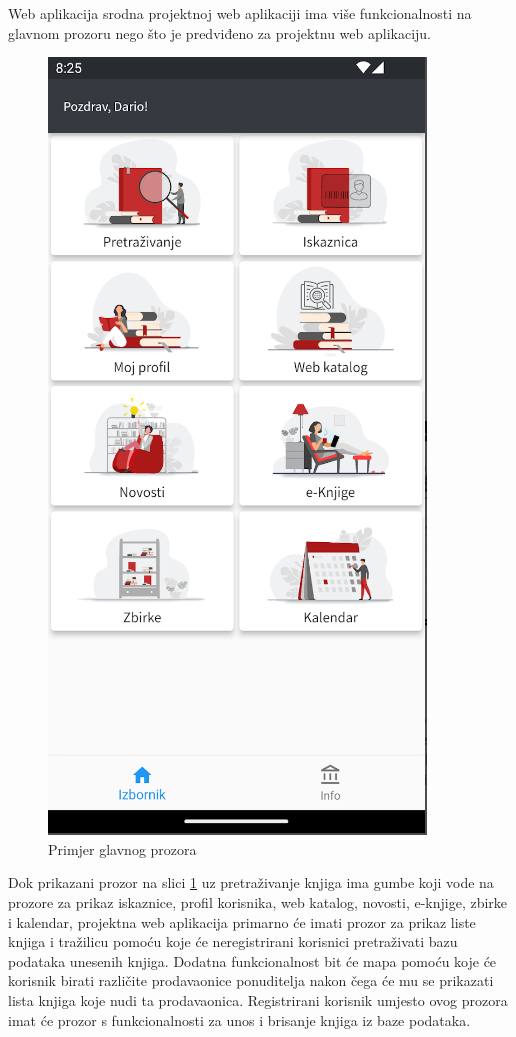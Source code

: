 	Web aplikacija srodna projektnoj web aplikaciji ima više funkcionalnosti na glavnom prozoru nego što je predviđeno za projektnu web aplikaciju.

	\begin{figure}[H]
		\includegraphics[scale=0.4]{slike/MainScreen.PNG} %
		\centering
		\caption{Primjer glavnog prozora}
		\label{fig:glavni prozor}
	\end{figure}	
	
	Dok prikazani prozor na slici \ref{fig:glavni prozor} uz pretraživanje knjiga ima gumbe koji vode na prozore za prikaz iskaznice, profil korisnika, web katalog, novosti, e-knjige, zbirke i kalendar, projektna web aplikacija primarno će imati prozor za prikaz liste knjiga i tražilicu pomoću koje će neregistrirani korisnici pretraživati bazu podataka unesenih knjiga. Dodatna funkcionalnost bit će mapa pomoću koje će korisnik birati različite prodavaonice ponuditelja nakon čega će mu se prikazati lista knjiga koje nudi ta prodavaonica. Registrirani korisnik umjesto ovog prozora imat će prozor s funkcionalnosti za unos i brisanje knjiga iz baze podataka.
	

